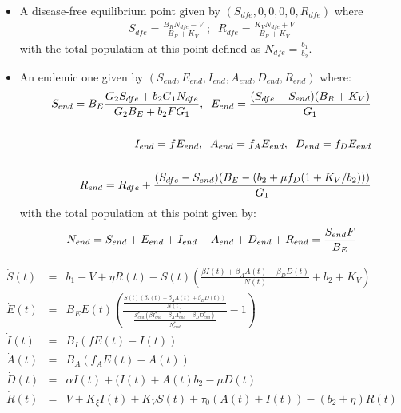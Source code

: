 \documentclass[10pt,a4paper]{article}
\begin{document}
\begin{itemize}
	\item 	A disease-free equilibrium point given by $(S_{dfe},0,0,0,0,R_{dfe})$ where
	\begin{eqnarray}
	S_{dfe}=\frac{B_R N_{dfe}-V}{B_R+K_V}\; ; \;\; R_{dfe}=\frac{K_V N_{dfe}+V}{B_R+K_V}\label{dfe-cont}
	\end{eqnarray}
	with  the total population at this point defined as $N_{dfe}=\frac{b_1}{b_2}$.
	\item
	An endemic one given by $(S_{end},E_{end},I_{end},A_{end},D_{end},R_{end})$ where:
	\begin{eqnarray}
	S_{end}=B_E\frac{G_2 S_{dfe}+b_2 G_1 N_{dfe}}{G_2 B_E+ b_2 F G_1},\;\; E_{end}=\frac{(S_{dfe}-S_{end})(B_R+K_V)}{G_1}\notag\\\notag\\
	I_{end}=f E_{end},\;\;A_{end}=f_A E_{end},\;\; D_{end}= f_D E_{end}\notag\\\notag\\
	R_{end}=R_{dfe}+\frac{(S_{dfe}-S_{end})(B_E-(b_2+\mu f_D (1+K_V/b_2)))}{G_1} \label{end-cont}
	\end{eqnarray}
	with the total population at this point given by:
	\begin{eqnarray}
	N_{end}=S_{end}+E_{end}+I_{end}+A_{end}+D_{end}+R_{end}=\frac{S_{end}F}{B_E}\notag
	\end{eqnarray}
\end{itemize}


\begin{eqnarray}	
\dot{S}(t)&=&b_1 -V+\eta R(t)-S(t)\left(\frac{\beta I(t)+\beta_A A(t)+\beta_D D(t)}{N(t)}+b_2+K_V\right)\label{eqcontS2}\\
\dot{E}(t)&=&B_E E(t)\left(\frac{\frac{S(t)\left(\beta I(t) +\beta_A A(t) +\beta_D D(t) \right)}{N(t)}}{\frac{S^*_{end}\left(\beta I^*_{end} +\beta_A A^*_{end} +\beta_D D^*_{end} \right)}{N^*_{end}}}-1\right)\\
\dot{I}(t)&=&B_I\left( f E(t)-I(t)\right)\\
\dot{A}(t)&=&B_A\left( f_A E(t)-A(t)\right)\\
\dot{D}(t)&=&\alpha I(t)+(I(t)+A(t)b_2-\mu D(t)\\
\dot{R}(t)&=& V+K_\xi I(t)+K_V S(t)+\tau_0 (A(t)+I(t))-(b_2+\eta)R(t)\label{eqcontR2}
\end{eqnarray}

\end{document}
